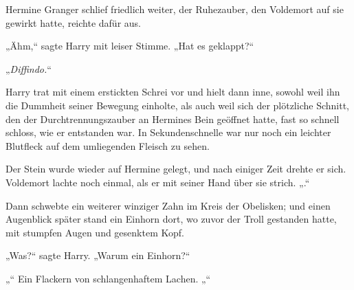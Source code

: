 Hermine Granger schlief friedlich weiter, der Ruhezauber, den Voldemort auf sie gewirkt hatte, reichte dafür aus.

„Ähm,“ sagte Harry mit leiser Stimme. „Hat es geklappt?“

„\emph{Diffindo.}“

Harry trat mit einem erstickten Schrei vor und hielt dann inne, sowohl weil ihn die Dummheit seiner Bewegung einholte, als auch weil sich der plötzliche Schnitt, den der Durchtrennungszauber an Hermines Bein geöffnet hatte, fast so schnell schloss, wie er entstanden war. In Sekundenschnelle war nur noch ein leichter Blutfleck auf dem umliegenden Fleisch zu sehen.

Der Stein wurde wieder auf Hermine gelegt, und nach einiger Zeit drehte er sich.
Voldemort lachte noch einmal, als er mit seiner Hand über sie strich.
„.“

Dann schwebte ein weiterer winziger Zahn im Kreis der Obelisken; und einen Augenblick später stand ein Einhorn dort, wo zuvor der Troll gestanden hatte, mit stumpfen Augen und gesenktem Kopf.

„Was?“ sagte Harry. „Warum ein Einhorn?“

„“
Ein Flackern von schlangenhaftem Lachen.
„“

